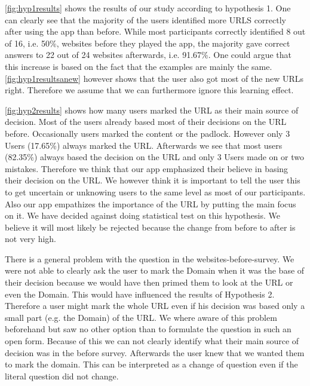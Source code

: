 \begin{description}[leftmargin=0cm]
\item[Hypothesis 1]
\autoref{fig:hyp1results} shows the results of our study according to hypothesis 1. One can clearly see that the majority of the users identified more URLS correctly after using the app than before. While most participants correctly identified 8 out of 16, i.e. 50\%, websites before they played the app, the majority gave correct answers to 22 out of 24 websites afterwards, i.e. 91.67\%. One could argue that this increase is based on the fact that the examples are mainly the same. \autoref{fig:hyp1resultsanew} however shows that the user also got most of the new URLs right. Therefore we assume that we can furthermore ignore this learning effect.
\item[Hypothesis 2]
\autoref{fig:hyp2results} shows how many users marked the URL as their main source of decision.
Most of the users already based most of their decisions on the URL before.
Occasionally users marked the content or the padlock.
However only 3 Users (17.65\%) always marked the URL.
Afterwards we see that most users (82.35\%) always based the decision on the URL and only 3 Users made on or two mistakes.
Therefore we think that our app emphasized their believe in basing their decision on the URL.
We however think it is important to tell the user this to get uncertain or unknowing users to the same level as most of our participants.
Also our app empathizes the importance of the URL by putting the main focus on it.
We have decided against doing statistical test on this hypothesis.
We believe it will most likely be rejected because the change from before to after is not very high.
\item[Hypothesis 3]
There is a general problem with the question in the websites-before-survey.
We were not able to clearly ask the user to mark the Domain when it was the base of their decision because we would have then primed them to look at the URL or even the Domain.
This would have influenced the results of Hypothesis 2.
Therefore a user might mark the whole URL even if his decision was based only a small part (e.g. the Domain) of the URL.
We where aware of this problem beforehand but saw no other option than to formulate the question in such an open form.
Because of this we can not clearly identify what their main source of decision was in the before survey.
Afterwards the user knew that we wanted them to mark the domain.
This can be interpreted as a change of question even if the literal question did not change.

\end{description}
